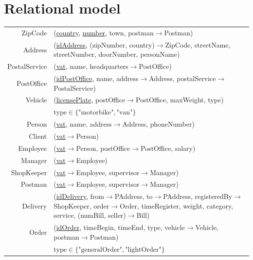 \documentclass{report}[a4paper]
\theoremstyle{remark}
\begin{document}
\chapter{Relational model}
\begin{center} \setlength{\tabcolsep}{1pt}
    \begin{tabular}{r p{144mm}}
        ZipCode         & (\uline{country}, \uline{number}, town, postman$\rightarrow$Postman)  \\
        Address         & (\uline{idAddress}, (zipNumber, country)$\rightarrow$ZipCode, streetName, streetNumber, doorNumber, personName) \\
        PostalService   & (\uline{vat}, name, headquarters$\rightarrow$PostOffice)              \\
        PostOffice      & (\uline{idPostOffice}, name, address$\rightarrow$Address, postalService$\rightarrow$PostalService) \\
        Vehicle         & (\uline{licensePlate}, postOffice$\rightarrow$PostOffice, maxWeight, type) \\
                        & $\text{type} \in \{\text{"motorbike"}, \text{"van"}\}$\\
        Person          & (\uline{vat}, name, address$\rightarrow$Address, phoneNumber)         \\
        Client          & (\uline{vat}$\rightarrow$Person)                                      \\
        Employee        & (\uline{vat}$\rightarrow$Person, postOffice$\rightarrow$PostOffice, salary) \\
        Manager         & (\uline{vat}$\rightarrow$Employee)                                    \\
        ShopKeeper      & (\uline{vat}$\rightarrow$Employee, supervisor$\rightarrow$Manager)    \\
        Postman         & (\uline{vat}$\rightarrow$Employee, supervisor$\rightarrow$Manager)    \\
        Delivery        & (\uline{idDelivery}, from$\rightarrow$PAddress, to$\rightarrow$PAddress, registeredBy$\rightarrow$ShopKeeper, order$\rightarrow$Order, timeRegister, weight, category, service, (numBill, seller)$\rightarrow$Bill) \\
        Order           & (\uline{idOrder}, timeBegin, timeEnd, type, vehicle$\rightarrow$Vehicle, postman$\rightarrow$Postman) \\
                        & $\text{type} \in \{\text{"generalOrder"}, \text{"lightOrder"}\}$\\

\end{tabular}
\end{center}
\end{document}
